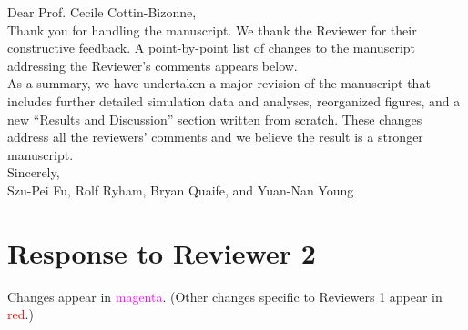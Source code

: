 \documentclass[11pt]{article}
\begin{document}
\noindent Dear Prof. Cecile Cottin-Bizonne,\\

\noindent Thank you for handling the manuscript.
We thank the Reviewer for their constructive feedback.
A point-by-point list of changes to the manuscript 
addressing the Reviewer's comments appears below.\\

\noindent As a summary, we have undertaken a major revision of the manuscript
that includes further detailed simulation data and analyses,
reorganized figures, and a new ``Results and Discussion'' section
written from scratch.  These changes address all the reviewers'
comments and we believe the result is a stronger manuscript.\\


\noindent
Sincerely,
\\
\noindent
Szu-Pei Fu, Rolf Ryham, Bryan Quaife, and Yuan-Nan Young

\section*{Response to Reviewer 2}

\noindent Changes appear in \textcolor{magenta}{magenta}.
(Other changes specific to Reviewers 1 appear in \textcolor{red}{red}.)\\ \\
\end{document}
